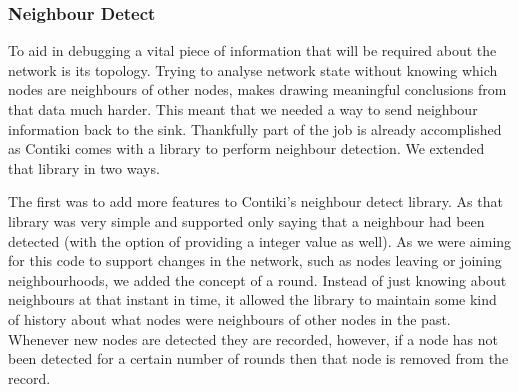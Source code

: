 \begin{figure}[ht!]
\centering
{}

\end{figure}

\subsubsection{Neighbour Detect}

To aid in debugging a vital piece of information that will be required about the network is its topology. Trying to analyse network state without knowing which nodes are neighbours of other nodes, makes drawing meaningful conclusions from that data much harder. This meant that we needed a way to send neighbour information back to the sink. Thankfully part of the job is already accomplished as Contiki comes with a library to perform neighbour detection\cite{?}. We extended that library in two ways.

The first was to add more features to Contiki's neighbour detect library. As that library was very simple and supported only saying that a neighbour had been detected (with the option of providing a integer value as well). As we were aiming for this code to support changes in the network, such as nodes leaving or joining neighbourhoods, we added the concept of a round. Instead of just knowing about neighbours at that instant in time, it allowed the library to maintain some kind of history about what nodes were neighbours of other nodes in the past. Whenever new nodes are detected they are recorded, however, if a node has not been detected for a certain number of rounds then that node is removed from the record.

